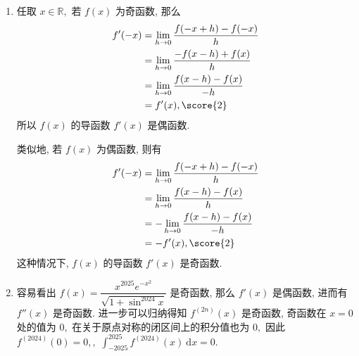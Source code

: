 \begin{solution}
\begin{enumerate}
\item 任取 $x \in \mathbb{R},$ 若 $f(x)$ 为奇函数, 那么
\begin{align*}
f'(-x) & = \lim_{h\to 0} \dfrac{f(-x+h) - f(-x)}{h} \\
& = \lim_{h\to 0} \dfrac{-f(x-h) + f(x)}{h} \\
& = \lim_{h\to 0} \dfrac{f(x-h) - f(x)}{-h} \\
& = f'(x), \score{2}
\end{align*}
所以 $f(x)$ 的导函数 $f'(x)$ 是偶函数.

类似地, 若 $f(x)$ 为偶函数, 则有
\begin{align*}
f'(-x) & = \lim_{h\to 0} \dfrac{f(-x+h) - f(-x)}{h} \\
& = \lim_{h\to 0} \dfrac{f(x-h) - f(x)}{h} \\
& = - \lim_{h\to 0} \dfrac{f(x-h) - f(x)}{-h} \\
& = -f'(x), \score{2}
\end{align*}
这种情况下, $f(x)$ 的导函数 $f'(x)$ 是奇函数.
\item 容易看出 $\displaystyle f(x) = \dfrac{x^{2025} e^{-x^2}}{\sqrt{1 + \sin^{2024} x}}$ 是奇函数, 
那么 $f'(x)$ 是偶函数, 进而有 $f''(x)$ 是奇函数. 进一步可以归纳得知 $f^{(2n)}(x)$ 是奇函数, 
奇函数在 $x = 0$ 处的值为 $0,$ 在关于原点对称的闭区间上的积分值也为 $0,$ 
因此 $f^{(2024)}(0) = 0,,$ $\displaystyle \int_{-2025}^{2025} f^{(2024)}(x) ~ \mathrm{d} x = 0.$ 
\end{enumerate}
\end{solution}



